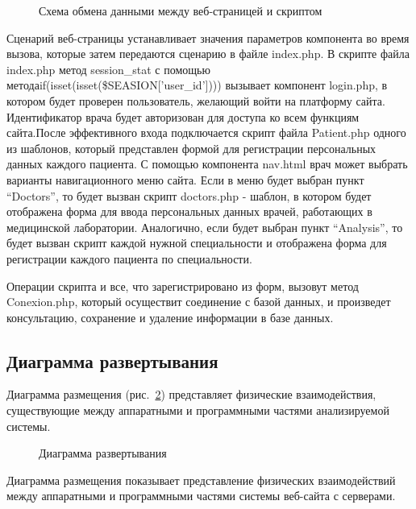 \begin{figure}
\caption{Схема обмена данными между веб-страницей и скриптом}
\label{image:diagram2}
\end{figure}

Сценарий веб-страницы устанавливает значения параметров компонента во время вызова, которые затем передаются сценарию в файле index.php.
В скрипте файла index.php метод session\_stat с помощью метода\linebreak if(isset(isset(\$SEASION['user\_id']))) вызывает компонент login.php, в котором будет проверен пользователь, желающий войти на платформу сайта. Идентификатор врача будет авторизован для доступа ко всем функциям сайта.\linebreak После эффективного входа подключается скрипт файла Patient.php одного из шаблонов, который представлен формой для регистрации персональных данных каждого пациента. С помощью компонента nav.html врач может выбрать варианты навигационного меню сайта. Если в меню будет выбран пункт ``Doctors'', то будет вызван скрипт doctors.php - шаблон, в котором будет отображена форма для ввода персональных данных врачей, работающих в медицинской лаборатории. Аналогично, если будет выбран пункт ``Analysis'', то будет вызван скрипт каждой нужной специальности и отображена форма для регистрации каждого пациента по специальности. 

Операции скрипта и все, что зарегистрировано из форм, вызовут метод Conexion.php, который осуществит соединение с базой данных, и произведет консультацию, сохранение и удаление информации в базе данных.

\subsection{Диаграмма развертывания}

Диаграмма размещения (рис.~\ref{image:diagram3}) представляет физические взаимодействия, существующие между аппаратными и программными частями анализируемой системы.

\begin{figure}
\caption{Диаграмма развертывания}
\label{image:diagram3}
\end{figure}

Диаграмма размещения показывает представление физических взаимодействий между аппаратными и программными частями системы веб-сайта с серверами.


